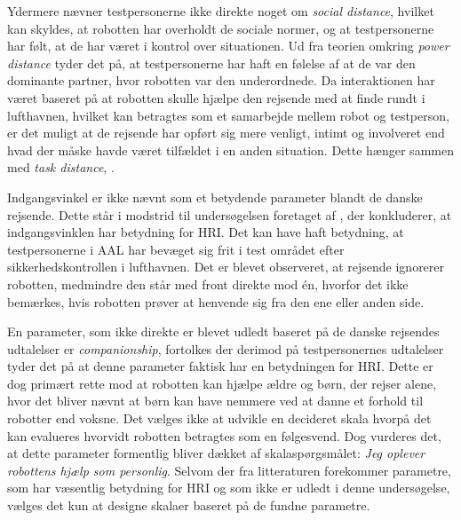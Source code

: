 Ydermere nævner testpersonerne ikke direkte noget om \textit{social distance}, hvilket kan skyldes, at robotten har overholdt de sociale normer, og at testpersonerne har følt, at de har været i kontrol over situationen. Ud fra teorien omkring \textit{power distance} tyder det på, at testpersonerne har haft en følelse af at de var den dominante partner, hvor robotten var den underordnede. Da interaktionen har været baseret på at robotten skulle hjælpe den rejsende med at finde rundt i lufthavnen, hvilket kan betragtes som et samarbejde mellem robot og testperson, er det muligt at de rejsende har opført sig mere venligt, intimt og involveret end hvad der måske havde været tilfældet i en anden situation. Dette hænger sammen med \textit{task distance}, \parencite[s. 784]{PDF:HowSocialDistanceShapesHRI}. 

Indgangsvinkel er ikke nævnt som et betydende parameter blandt de danske rejsende. Dette står i modstrid til undersøgelsen foretaget af \textcite{PDF:HowMayIServeYou}, der konkluderer, at indgangsvinklen har betydning for HRI. Det kan have haft betydning, at testpersonerne i AAL har bevæget sig frit i test området efter sikkerhedskontrollen i lufthavnen. Det er blevet observeret, at rejsende ignorerer robotten, medmindre den står med front direkte mod én, hvorfor det ikke bemærkes, hvis robotten prøver at henvende sig fra den ene eller anden side. 

En parameter, som ikke direkte er blevet udledt baseret på de danske rejsendes udtalelser er \textit{companionship}, fortolkes der derimod på testpersonernes udtalelser tyder det på at denne parameter faktisk har en betydningen for HRI. Dette er dog primært rette mod at robotten kan hjælpe ældre og børn, der rejser alene, hvor det bliver nævnt at børn kan have nemmere ved at danne et forhold til robotter end voksne. Det vælges ikke at udvikle en decideret skala hvorpå det kan evalueres hvorvidt robotten betragtes som en følgesvend. Dog vurderes det, at dette parameter formentlig bliver dækket af skalaspørgsmålet: \textit{Jeg oplever robottens hjælp som personlig}. \blankline
%
Selvom der fra litteraturen forekommer parametre, som har væsentlig betydning for HRI og som ikke er udledt i denne undersøgelse, vælges det kun at designe skalaer baseret på de fundne parametre. 
